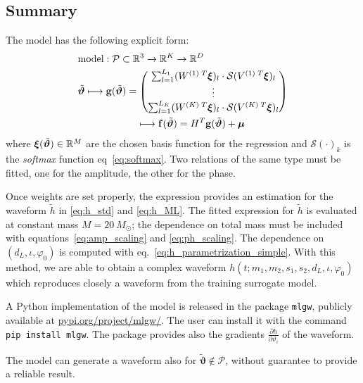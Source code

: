 \subsection{Summary}
The model has the following explicit form:
\begin{align}
	& \textrm{model}: \mathcal{P} \subset \mathbb{R}^3 \rightarrow \mathbb{R}^K \rightarrow \mathbb{R}^D \nonumber\\
	& {\tilde{\boldsymbol{\vartheta}}}
	\longmapsto  \mathbf{g}({\tilde{\boldsymbol{\vartheta}}} ) = 
		\begin{pmatrix}
		\sum_{l=1}^{L_1} (W^{(1)\;T} \boldsymbol{\xi})_l \cdot \mathcal{S}(V^{(1)\;T}\boldsymbol{\xi})_l \\
		\vdots \\
		\sum_{l=1}^{L_K}  (W^{(K)\;T} \boldsymbol{\xi})_l \cdot \mathcal{S}(V^{(K)\;T}\boldsymbol{\xi})_l
		\end{pmatrix}
	\nonumber \\	
	& \qquad \qquad \qquad \longmapsto \mathbf{f}({\tilde{\boldsymbol{\vartheta}}} ) = H^T \mathbf{g}({\tilde{\boldsymbol{\vartheta}}} ) + \boldsymbol{\mu} \label{eq:model}
\end{align}
where ${\boldsymbol{\xi}}({\tilde{\boldsymbol{\vartheta}}}) \in \mathbb{R}^M $ are the chosen basis function for the regression and $\mathcal{S}(\cdot)_k$ is the \textit{softmax} function eq~\eqref{eq:softmax}.
Two relations of the same type must be fitted, one for the amplitude, the other for the phase.
\par
Once weights are set properly, the expression provides an estimation for the waveform $\tilde{h}$ in \eqref{eq:h_std} and \eqref{eq:h_ML}.
The fitted expression for  $\tilde{h}$ is evaluated at constant mass $M = \SI{20}{M_\odot}$; the dependence on total mass must be included with equations~\eqref{eq:amp_scaling} and \eqref{eq:ph_scaling}.
The dependence on $(d_L, \iota, \varphi_0)$ is computed with eq.~\eqref{eq:h_parametrization_simple}.
With this method, we are able to obtain a complex waveform $h(t;m_1,m_2, s_1, s_2, d_L, \iota, \varphi_0)$ which reproduces closely a waveform from the training surrogate model.
\par
A Python implementation of the model is released in the package \texttt{mlgw}, publicly available at \href{https://pypi.org/project/mlgw/}{pypi.org/project/mlgw/}. The user can install it with the command \texttt{pip install mlgw}.
The package provides also the gradients $\frac{\partial h}{\partial \vartheta_i}$ of the waveform.
\par
The model can generate a waveform also for $\tilde{\boldsymbol{\vartheta}} \notin \mathcal{P}$, without guarantee to provide a reliable result.
